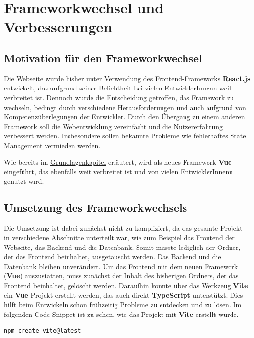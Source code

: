 \section{Frameworkwechsel und Verbesserungen}

\subsection{Motivation für den Frameworkwechsel}

Die Webseite wurde bisher unter Verwendung des Frontend-Frameworks \textbf{React.js} entwickelt, das aufgrund seiner Beliebtheit bei vielen EntwicklerInnenn weit verbreitet ist. Dennoch wurde die Entscheidung getroffen, das Framework zu wechseln, bedingt durch verschiedene Herausforderungen und auch aufgrund von Kompetenzüberlegungen der Entwickler. Durch den Übergang zu einem anderen Framework soll die Webentwicklung vereinfacht und die Nutzererfahrung verbessert werden. Insbesondere sollen bekannte Probleme wie fehlerhaftes State Management vermieden werden.

Wie bereits im \hyperref[chapter:3-frontend-frameworks]{Grundlagenkapitel} erläutert, wird als neues Framework \textbf{Vue} eingeführt, das ebenfalls weit verbreitet ist und von vielen EntwicklerInnenn genutzt wird.

\subsection{Umsetzung des Frameworkwechsels}

Die Umsetzung ist dabei zunächst nicht zu kompliziert, da das gesamte Projekt in verschiedene Abschnitte unterteilt war, wie zum Beispiel das Frontend der Webseite, das Backend und die Datenbank. Somit musste lediglich der Ordner, der das Frontend beinhaltet, ausgetauscht werden. Das Backend und die Datenbank bleiben unverändert. Um das Frontend mit dem neuen Framework (\textbf{Vue}) auszustatten, muss zunächst der Inhalt des bisherigen Ordners, der das Frontend beinhaltet, gelöscht werden. Daraufhin konnte über das Werkzeug \textbf{Vite} ein \textbf{Vue}-Projekt erstellt werden, das auch direkt \textbf{TypeScript} unterstützt. Dies hilft beim Entwickeln schon frühzeitig Probleme zu entdecken und zu lösen. Im folgenden Code-Snippet ist zu sehen, wie das Projekt mit \textbf{Vite} erstellt wurde.

\begin{lstlisting}[language={bash}, caption={Initialisierung des Vue Projektes mit Vite \cite{vitejs-getting-started}}]
npm create vite@latest
\end{lstlisting}

